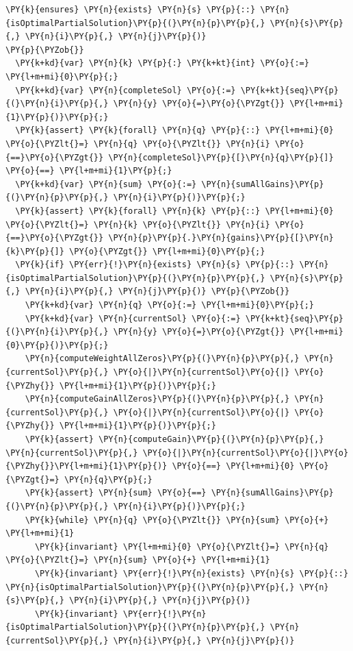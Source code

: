 \begin{sloppypar}
\begin{enumerate}
\begin{Verbatim}[commandchars=\\\{\}]
 \PY{k}{ensures} \PY{n}{exists} \PY{n}{s} \PY{p}{::} \PY{n}{isOptimalPartialSolution}\PY{p}{(}\PY{n}{p}\PY{p}{,} \PY{n}{s}\PY{p}{,} \PY{n}{i}\PY{p}{,} \PY{n}{j}\PY{p}{)}
\PY{p}{\PYZob{}}
  \PY{k+kd}{var} \PY{n}{k} \PY{p}{:} \PY{k+kt}{int} \PY{o}{:=} \PY{l+m+mi}{0}\PY{p}{;}
  \PY{k+kd}{var} \PY{n}{completeSol} \PY{o}{:=} \PY{k+kt}{seq}\PY{p}{(}\PY{n}{i}\PY{p}{,} \PY{n}{y} \PY{o}{=}\PY{o}{\PYZgt{}} \PY{l+m+mi}{1}\PY{p}{)}\PY{p}{;}
  \PY{k}{assert} \PY{k}{forall} \PY{n}{q} \PY{p}{::} \PY{l+m+mi}{0} \PY{o}{\PYZlt{}=} \PY{n}{q} \PY{o}{\PYZlt{}} \PY{n}{i} \PY{o}{==}\PY{o}{\PYZgt{}} \PY{n}{completeSol}\PY{p}{[}\PY{n}{q}\PY{p}{]} \PY{o}{==} \PY{l+m+mi}{1}\PY{p}{;}
  \PY{k+kd}{var} \PY{n}{sum} \PY{o}{:=} \PY{n}{sumAllGains}\PY{p}{(}\PY{n}{p}\PY{p}{,} \PY{n}{i}\PY{p}{)}\PY{p}{;}
  \PY{k}{assert} \PY{k}{forall} \PY{n}{k} \PY{p}{::} \PY{l+m+mi}{0} \PY{o}{\PYZlt{}=} \PY{n}{k} \PY{o}{\PYZlt{}} \PY{n}{i} \PY{o}{==}\PY{o}{\PYZgt{}} \PY{n}{p}\PY{p}{.}\PY{n}{gains}\PY{p}{[}\PY{n}{k}\PY{p}{]} \PY{o}{\PYZgt{}} \PY{l+m+mi}{0}\PY{p}{;}
  \PY{k}{if} \PY{err}{!}\PY{n}{exists} \PY{n}{s} \PY{p}{::} \PY{n}{isOptimalPartialSolution}\PY{p}{(}\PY{n}{p}\PY{p}{,} \PY{n}{s}\PY{p}{,} \PY{n}{i}\PY{p}{,} \PY{n}{j}\PY{p}{)} \PY{p}{\PYZob{}}
    \PY{k+kd}{var} \PY{n}{q} \PY{o}{:=} \PY{l+m+mi}{0}\PY{p}{;} 
    \PY{k+kd}{var} \PY{n}{currentSol} \PY{o}{:=} \PY{k+kt}{seq}\PY{p}{(}\PY{n}{i}\PY{p}{,} \PY{n}{y} \PY{o}{=}\PY{o}{\PYZgt{}} \PY{l+m+mi}{0}\PY{p}{)}\PY{p}{;}
    \PY{n}{computeWeightAllZeros}\PY{p}{(}\PY{n}{p}\PY{p}{,} \PY{n}{currentSol}\PY{p}{,} \PY{o}{|}\PY{n}{currentSol}\PY{o}{|} \PY{o}{\PYZhy{}} \PY{l+m+mi}{1}\PY{p}{)}\PY{p}{;}
    \PY{n}{computeGainAllZeros}\PY{p}{(}\PY{n}{p}\PY{p}{,} \PY{n}{currentSol}\PY{p}{,} \PY{o}{|}\PY{n}{currentSol}\PY{o}{|} \PY{o}{\PYZhy{}} \PY{l+m+mi}{1}\PY{p}{)}\PY{p}{;}
    \PY{k}{assert} \PY{n}{computeGain}\PY{p}{(}\PY{n}{p}\PY{p}{,} \PY{n}{currentSol}\PY{p}{,} \PY{o}{|}\PY{n}{currentSol}\PY{o}{|}\PY{o}{\PYZhy{}}\PY{l+m+mi}{1}\PY{p}{)} \PY{o}{==} \PY{l+m+mi}{0} \PY{o}{\PYZgt{}=} \PY{n}{q}\PY{p}{;}
    \PY{k}{assert} \PY{n}{sum} \PY{o}{==} \PY{n}{sumAllGains}\PY{p}{(}\PY{n}{p}\PY{p}{,} \PY{n}{i}\PY{p}{)}\PY{p}{;}
    \PY{k}{while} \PY{n}{q} \PY{o}{\PYZlt{}} \PY{n}{sum} \PY{o}{+} \PY{l+m+mi}{1}
      \PY{k}{invariant} \PY{l+m+mi}{0} \PY{o}{\PYZlt{}=} \PY{n}{q} \PY{o}{\PYZlt{}=} \PY{n}{sum} \PY{o}{+} \PY{l+m+mi}{1}
      \PY{k}{invariant} \PY{err}{!}\PY{n}{exists} \PY{n}{s} \PY{p}{::} \PY{n}{isOptimalPartialSolution}\PY{p}{(}\PY{n}{p}\PY{p}{,} \PY{n}{s}\PY{p}{,} \PY{n}{i}\PY{p}{,} \PY{n}{j}\PY{p}{)}
      \PY{k}{invariant} \PY{err}{!}\PY{n}{isOptimalPartialSolution}\PY{p}{(}\PY{n}{p}\PY{p}{,} \PY{n}{currentSol}\PY{p}{,} \PY{n}{i}\PY{p}{,} \PY{n}{j}\PY{p}{)}

\end{Verbatim}
\end{enumerate}
\end{sloppypar}
